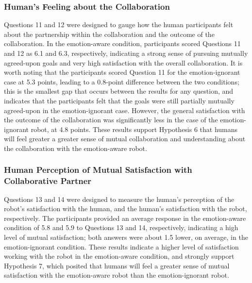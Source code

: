 \documentclass[12pt]{report}
\begin{document}
\subsubsection{Human's Feeling about the Collaboration}
\label{sec:Collaboration}
Questions 11 and 12 were designed to gauge how the human participants felt
about the partnership within the collaboration and the outcome of the
collaboration. In the emotion-aware condition, participants scored Questions 11
and 12 as 6.1 and 6.3, respectively, indicating a strong sense of pursuing
mutually agreed-upon goals and very high satisfaction with the overall
collaboration. It is worth noting that the participants scored Question 11 for
the emotion-ignorant case at 5.3 points, leading to a 0.8-point difference
between the two conditions; this is the smallest gap that occurs between the
results for any question, and indicates that the participants felt that the
goals were still partially mutually agreed-upon in the emotion-ignorant case.
However, the general satisfaction with the outcome of the collaboration was
significantly less in the case of the emotion-ignorant robot, at 4.8 points.
These results support Hypothesis 6 that humans will feel greater a greater sense
of mutual collaboration and understanding about the collaboration with the
emotion-aware robot.

\subsubsection{Human Perception of Mutual Satisfaction with Collaborative
Partner}
\label{sec:MutualSatisfaction}
Questions 13 and 14 were designed to measure the human's perception of the
robot's satisfaction with the human, and the human's satisfaction with the
robot, respectively. The participants provided an average response in the
emotion-aware condition of 5.8 and 5.9 to Questions 13 and 14, respectively,
indicating a high level of mutual satisfaction; both answers were about 1.5
lower, on average, in the emotion-ignorant condition. These results indicate a
higher level of satisfaction working with the robot in the emotion-aware
condition, and strongly support Hypothesis 7, which posited that humans will
feel a greater sense of mutual satisfaction with the emotion-aware robot than
the emotion-ignorant robot.
\end{document}
